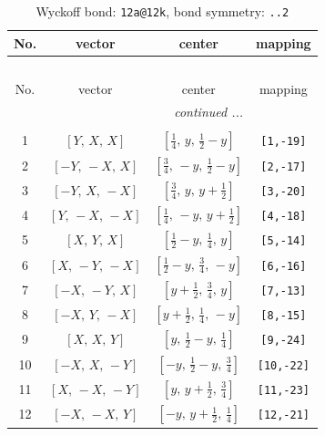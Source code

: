 \documentclass[fleqn,8pt]{jsarticle}
\begin{document}
\begin{longtable}{cccc}
\caption{Wyckoff bond: {\tt 12a@12k}, bond symmetry: {\tt ..2}}
 \\
 \hline \hline
No. & vector & center & mapping \\ \hline \endfirsthead

\multicolumn{3}{l}{\tablename\ \thetable{}} \\
 \hline \hline
No. & vector & center & mapping \\ \hline \endhead

 \hline \hline
\multicolumn{3}{r}{\footnotesize\it continued ...} \\ \endfoot

 \hline \hline
\multicolumn{3}{r}{} \\ \endlastfoot

1 & $\left[ Y,\, X,\, X \right]$ & $\left[ \frac{1}{4},\, y,\, \frac{1}{2} - y \right]$ & {\tt [1,-19]} \\ \hline
2 & $\left[ - Y,\, - X,\, X \right]$ & $\left[ \frac{3}{4},\, - y,\, \frac{1}{2} - y \right]$ & {\tt [2,-17]} \\ \hline
3 & $\left[ - Y,\, X,\, - X \right]$ & $\left[ \frac{3}{4},\, y,\, y + \frac{1}{2} \right]$ & {\tt [3,-20]} \\ \hline
4 & $\left[ Y,\, - X,\, - X \right]$ & $\left[ \frac{1}{4},\, - y,\, y + \frac{1}{2} \right]$ & {\tt [4,-18]} \\ \hline
5 & $\left[ X,\, Y,\, X \right]$ & $\left[ \frac{1}{2} - y,\, \frac{1}{4},\, y \right]$ & {\tt [5,-14]} \\ \hline
6 & $\left[ X,\, - Y,\, - X \right]$ & $\left[ \frac{1}{2} - y,\, \frac{3}{4},\, - y \right]$ & {\tt [6,-16]} \\ \hline
7 & $\left[ - X,\, - Y,\, X \right]$ & $\left[ y + \frac{1}{2},\, \frac{3}{4},\, y \right]$ & {\tt [7,-13]} \\ \hline
8 & $\left[ - X,\, Y,\, - X \right]$ & $\left[ y + \frac{1}{2},\, \frac{1}{4},\, - y \right]$ & {\tt [8,-15]} \\ \hline
9 & $\left[ X,\, X,\, Y \right]$ & $\left[ y,\, \frac{1}{2} - y,\, \frac{1}{4} \right]$ & {\tt [9,-24]} \\ \hline
10 & $\left[ - X,\, X,\, - Y \right]$ & $\left[ - y,\, \frac{1}{2} - y,\, \frac{3}{4} \right]$ & {\tt [10,-22]} \\ \hline
11 & $\left[ X,\, - X,\, - Y \right]$ & $\left[ y,\, y + \frac{1}{2},\, \frac{3}{4} \right]$ & {\tt [11,-23]} \\ \hline
12 & $\left[ - X,\, - X,\, Y \right]$ & $\left[ - y,\, y + \frac{1}{2},\, \frac{1}{4} \right]$ & {\tt [12,-21]} \\
\end{longtable}
\end{document}

